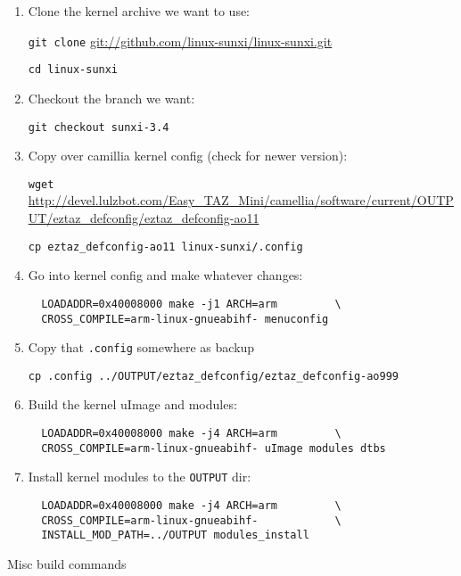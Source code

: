 \begin{enumerate}
  \item {Clone the kernel archive we want to use:
  
  \verb|git clone| \url{git://github.com/linux-sunxi/linux-sunxi.git}
  
  \verb|cd linux-sunxi|
  }

  \item{Checkout the branch we want:
  
  \verb|git checkout sunxi-3.4|
  }

  \item{Copy over camillia kernel config (check for newer version):
  
  \verb|wget| \url{http://devel.lulzbot.com/Easy_TAZ_Mini/camellia/software/current/OUTPUT/eztaz_defconfig/eztaz_defconfig-ao11}
  
  \verb|cp eztaz_defconfig-ao11 linux-sunxi/.config|
  }

  \item{Go into kernel config and make whatever changes:

  \begin{verbatim}
  LOADADDR=0x40008000 make -j1 ARCH=arm         \
  CROSS_COMPILE=arm-linux-gnueabihf- menuconfig
  \end{verbatim}
  }

  \item{Copy that \verb|.config| somewhere as backup
  
  \verb|cp .config ../OUTPUT/eztaz_defconfig/eztaz_defconfig-ao999|
  }

  \item{Build the kernel uImage and modules:
  
  \begin{verbatim}
  LOADADDR=0x40008000 make -j4 ARCH=arm         \
  CROSS_COMPILE=arm-linux-gnueabihf- uImage modules dtbs
  \end{verbatim}
  }

  \item{Install kernel modules to the \texttt{OUTPUT} dir:

  \begin{verbatim}
  LOADADDR=0x40008000 make -j4 ARCH=arm         \
  CROSS_COMPILE=arm-linux-gnueabihf-            \
  INSTALL_MOD_PATH=../OUTPUT modules_install
  \end{verbatim}
  }

\end{enumerate}


Misc build commands

